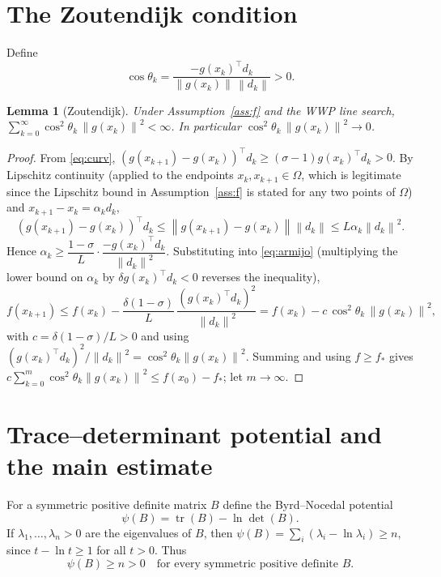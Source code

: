 \documentclass{amsart}
\newtheorem{lemma}{Lemma}
\theoremstyle{definition}
\DeclareMathOperator{\tr}{tr}
\newcommand{\norm}[1]{\left\lVert #1\right\rVert}
\begin{document}
\section{The Zoutendijk condition}

Define
\[
   \cos\theta_k=\frac{-g(x_k)^\top d_k}{\norm{g(x_k)}\,\norm{d_k}}>0 .
\]

\begin{lemma}[Zoutendijk]\label{lem:zoutendijk}
Under Assumption~\ref{ass:f} and the WWP line search,
$\sum_{k=0}^\infty\cos^2\theta_k\,\norm{g(x_k)}^2<\infty$. In particular
$\cos^2\theta_k\,\norm{g(x_k)}^2\to0$.
\end{lemma}

\begin{proof}
From \eqref{eq:curv},
$(g(x_{k+1})-g(x_k))^\top d_k\ge(\sigma-1)g(x_k)^\top d_k>0$. By Lipschitz
continuity (applied to the endpoints $x_k,x_{k+1}\in\Omega$, which is
legitimate since the Lipschitz bound in Assumption~\ref{ass:f} is stated for
any two points of $\Omega$) and $x_{k+1}-x_k=\alpha_k d_k$,
\[
   (g(x_{k+1})-g(x_k))^\top d_k\le\norm{g(x_{k+1})-g(x_k)}\norm{d_k}
   \le L\alpha_k\norm{d_k}^2 .
\]
Hence $\alpha_k\ge\dfrac{1-\sigma}{L}\cdot\dfrac{-g(x_k)^\top d_k}{\norm{d_k}^2}$.
Substituting into \eqref{eq:armijo} (multiplying the lower bound on $\alpha_k$ by
$\delta g(x_k)^\top d_k<0$ reverses the inequality),
\[
   f(x_{k+1})\le f(x_k)-\frac{\delta(1-\sigma)}{L}\,
   \frac{(g(x_k)^\top d_k)^2}{\norm{d_k}^2}
   = f(x_k)-c\,\cos^2\theta_k\,\norm{g(x_k)}^2,
\]
with $c=\delta(1-\sigma)/L>0$ and using
$(g(x_k)^\top d_k)^2/\norm{d_k}^2=\cos^2\theta_k\norm{g(x_k)}^2$. Summing and
using $f\ge f_*$ gives
$c\sum_{k=0}^m\cos^2\theta_k\norm{g(x_k)}^2\le f(x_0)-f_*$; let $m\to\infty$.
\end{proof}

\section{Trace--determinant potential and the main estimate}

For a symmetric positive definite matrix $B$ define the Byrd--Nocedal potential
\begin{equation}\label{eq:psi}
   \psi(B)=\tr(B)-\ln\det(B).
\end{equation}
If $\lambda_1,\dots,\lambda_n>0$ are the eigenvalues of $B$, then
$\psi(B)=\sum_{i}(\lambda_i-\ln\lambda_i)\ge n$, since $t-\ln t\ge1$ for all
$t>0$. Thus
\begin{equation}\label{eq:psi-pos}
   \psi(B)\ge n>0 \quad\text{for every symmetric positive definite }B.
\end{equation}
\end{document}
